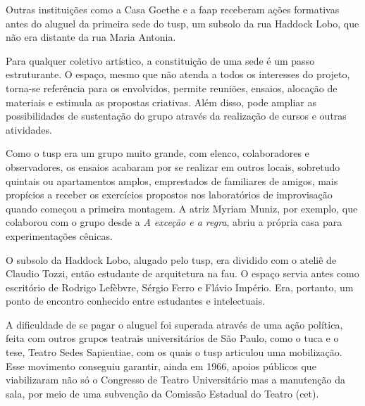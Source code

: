 Outras instituições como a Casa Goethe e a {\sc faap} receberam ações
formativas antes do aluguel da primeira sede do {\sc tusp}, um subsolo da rua
Haddock Lobo, que não era distante da rua Maria Antonia.

Para qualquer coletivo artístico, a constituição de uma sede é um passo
estruturante. O espaço, mesmo que não atenda a todos os interesses do
projeto, torna-se referência para os envolvidos, permite reuniões,
ensaios, alocação de materiais e estimula as propostas criativas. Além
disso, pode ampliar as possibilidades de sustentação do grupo através da
realização de cursos e outras atividades.

Como o {\sc tusp} era um grupo muito grande, com elenco, colaboradores e
observadores, os ensaios acabaram por se realizar em outros locais,
sobretudo quintais ou apartamentos amplos, emprestados de familiares de
amigos, mais propícios a receber os exercícios propostos nos
laboratórios de improvisação quando começou a primeira montagem. A atriz
Myriam Muniz, por exemplo, que colaborou com o grupo desde a {\it A
exceção e a regra}, abriu a própria casa para experimentações cênicas.

O subsolo da Haddock Lobo, alugado pelo {\sc tusp}, era dividido com o ateliê
de Claudio Tozzi, então estudante de arquitetura na {\sc fau}. O espaço servia
antes como escritório de Rodrigo Lefèbvre, Sérgio Ferro e Flávio
Império. Era, portanto, um ponto de encontro conhecido entre estudantes
e intelectuais.


A dificuldade de se pagar o aluguel foi superada através de uma ação
política, feita com outros grupos teatrais universitários de São Paulo,
como o {\sc tuca} e o {\sc tese}, Teatro Sedes Sapientiae, com os quais o {\sc tusp}
articulou uma mobilização. Esse movimento conseguiu garantir, ainda em
1966, apoios públicos que viabilizaram não só o Congresso de Teatro
Universitário mas a manutenção da sala, por meio de uma subvenção da
Comissão Estadual do Teatro ({\sc cet}).

